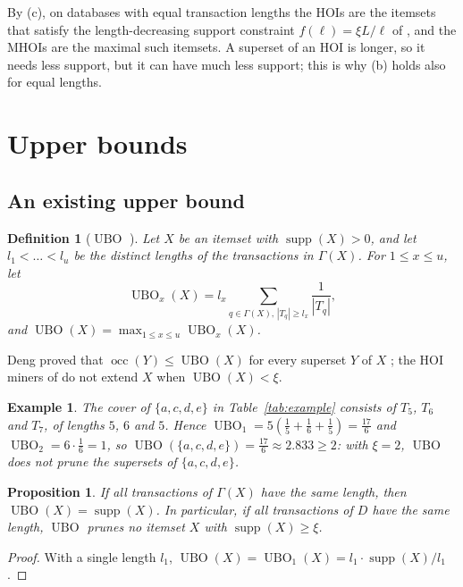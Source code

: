 \documentclass[pdflatex,sn-mathphys,Numbered]{sn-jnl}
\theoremstyle{thmstyleone}
\newtheorem{proposition}[theorem]{Proposition}
\theoremstyle{thmstyletwo}
\newtheorem{example}{Example}
\theoremstyle{thmstylethree}
\newtheorem{definition}{Definition}
\newcommand{\supp}{\operatorname{supp}}
\newcommand{\occ}{\operatorname{occ}}
\newcommand{\ubo}{\operatorname{UBO}}
\begin{document}
By (c), on databases with equal transaction lengths the HOIs are the itemsets that satisfy the length-decreasing support constraint $f(\ell) = \xi L / \ell$ of \cite{seno2005ldsc}, and the MHOIs are the maximal such itemsets. A superset of an HOI is longer, so it needs less support, but it can have much less support; this is why (b) holds also for equal lengths.

\section{Upper bounds}\label{sec:bounds}

\subsection{An existing upper bound}

\begin{definition}[$\ubo$ {\cite[Definition~7]{deng2020hoi}}]\label{def:ubo}
Let $X$ be an itemset with $\supp(X) > 0$, and let $l_1 < \dots < l_u$ be the distinct lengths of the transactions in $\Gamma(X)$. For $1 \le x \le u$, let
\[
\ubo_x(X) = l_x \sum_{q \in \Gamma(X),\, |T_q| \ge l_x} \frac{1}{|T_q|},
\]
and $\ubo(X) = \max_{1 \le x \le u} \ubo_x(X)$.
\end{definition}

Deng proved that $\occ(Y) \le \ubo(X)$ for every superset $Y$ of $X$ \cite[Theorem~4]{deng2020hoi}; the HOI miners of \cite{deng2020hoi,nguyen2023dfhoi} do not extend $X$ when $\ubo(X) < \xi$.

\begin{example}\label{ex:ubo}
The cover of $\{a,c,d,e\}$ in Table~\ref{tab:example} consists of $T_5$, $T_6$ and $T_7$, of lengths $5$, $6$ and $5$. Hence $\ubo_1 = 5 \left( \frac15 + \frac16 + \frac15 \right) = \frac{17}{6}$ and $\ubo_2 = 6 \cdot \frac16 = 1$, so $\ubo(\{a,c,d,e\}) = \frac{17}{6} \approx 2.833 \ge 2$: with $\xi = 2$, $\ubo$ does not prune the supersets of $\{a,c,d,e\}$.
\end{example}

\begin{proposition}\label{prop:ubo-uniform}
If all transactions of $\Gamma(X)$ have the same length, then $\ubo(X) = \supp(X)$. In particular, if all transactions of $D$ have the same length, $\ubo$ prunes no itemset $X$ with $\supp(X) \ge \xi$.
\end{proposition}
\begin{proof}
With a single length $l_1$, $\ubo(X) = \ubo_1(X) = l_1 \cdot \supp(X) / l_1$.
\end{proof}
\end{document}
